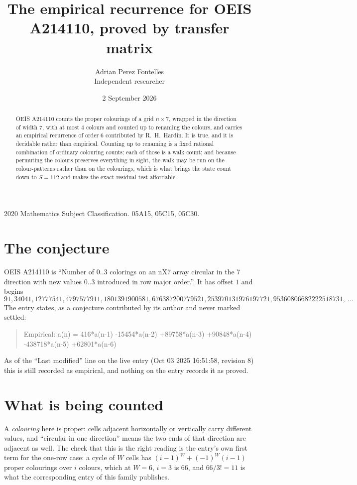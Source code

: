 \documentclass[11pt,a4paper]{article}
\title{The empirical recurrence for OEIS A214110, proved by transfer matrix}
\author{Adrian Perez Fontelles\\ \small Independent researcher}
\date{2 September 2026}
\theoremstyle{plain}
\theoremstyle{definition}
\begin{document}
\maketitle

\begin{abstract}
OEIS A214110 counts the proper colourings of a grid $n\times7$, wrapped in the direction of width $7$, with at most $4$ colours and
counted up to renaming the colours, and carries an empirical recurrence of order $6$
contributed by R.~H.~Hardin. It is true, and it is decidable rather than empirical. Counting
up to renaming is a fixed rational combination of ordinary colouring counts; each of those is
a walk count; and because permuting the colours preserves everything in sight, the walk may be
run on the colour-patterns rather than on the colourings, which is what brings the state count
down to $S=112$ and makes the exact residual test affordable.
\end{abstract}

\noindent\small 2020 Mathematics Subject Classification. 05A15, 05C15, 05C30.\normalsize

\section{The conjecture}

OEIS A214110 is ``Number of 0..3 colorings on an nX7 array circular in the 7 direction with new values 0..3 introduced in row major order.''. It has offset $1$ and begins
\[
91, 34041, 12777541, 4797577911, 1801391900581, 676387200779521, 253970131976197721, 95360806682222518731,\ \dots
\]
The entry states, as a conjecture contributed by its author and never marked settled:
\begin{quote}
Empirical: a(n) = 416*a(n-1) -15454*a(n-2) +89758*a(n-3) +90848*a(n-4) -438718*a(n-5) +62801*a(n-6)
\end{quote}
As of the ``Last modified'' line on the live entry (Oct 03 2025 16:51:58, revision 8) this is still
recorded as empirical, and nothing on the entry records it as proved.

\section{What is being counted}

A \emph{colouring} here is proper: cells adjacent horizontally or vertically carry different
values, and ``circular in one direction'' means the two ends of that direction are adjacent as
well. The check that this is the right reading is the entry's own first term for the
one-row case: a cycle of $W$ cells has $(i-1)^W+(-1)^W(i-1)$ proper colourings over $i$
colours, which at $W=6$, $i=3$ is $66$, and $66/3!=11$ is what the corresponding entry of this
family publishes.
\end{document}
